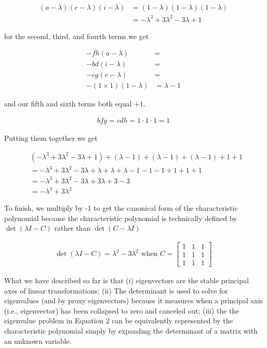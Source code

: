 \documentclass[
  letterpaper,
  DIV=11,
  numbers=noendperiod]{scrartcl}
\begin{document}
\begin{align*}
(a - \lambda)(e - \lambda)(i - \lambda) &= (1 - \lambda)(1 - \lambda)(1 - \lambda) \\
&= -\lambda^3 + 3\lambda^2 - 3\lambda + 1
\end{align*}

for the second, third, and fourth terms we get

\begin{align*}
-fh(a - \lambda) &= \\
-bd(i - \lambda) &= \\
-cg(e - \lambda) &= \\
-(1\times 1)(1 - \lambda) &= \lambda - 1
\end{align*}

and our fifth and sixth terms both equal \(+1\).

\begin{align*}
bfg = cdh = 1\cdot 1 \cdot 1 =  1
\end{align*}

Putting them together we get

\begin{align*}
&(-\lambda^3 + 3\lambda^2 - 3\lambda + 1) + (\lambda - 1) + (\lambda - 1) + (\lambda - 1) + 1 + 1  \\
&= -\lambda^3 + 3\lambda^2 - 3\lambda + \lambda + \lambda + \lambda - 1 - 1 - 1 + 1 + 1 + 1 \\
&= -\lambda^3 + 3\lambda^2 - 3\lambda + 3\lambda + 3 - 3 \\
&= -\lambda^3 + 3\lambda^2
\end{align*}

To finish, we multiply by -1 to get the canonical form of the
characteristic polynomial because the characteristic polynomial is
technically defined by \(\det(\lambda I - C )\) rather than
\(\det(C - \lambda I)\)

\begin{align*}
\det(\lambda I - C) = \lambda^3 - 3\lambda^2 \text{ when } C = \begin{bmatrix}1&1&1\\1&1&1\\1&1&1\end{bmatrix}
\end{align*}

What we have described so far is that (i) eigenvectors are the stable
principal axes of linear transformations; (ii) The determinant is used
to solve for eigenvalues (and by proxy eigenvectors) because it measures
when a principal axis (i.e., eigenvector) has been collapsed to zero and
canceled out; (iii) the the eigenvalue problem in Equation 2 can be
equivalently represented by the characteristic polynomial simply by
expanding the determinant of a matrix with an unknown variable.
\end{document}
